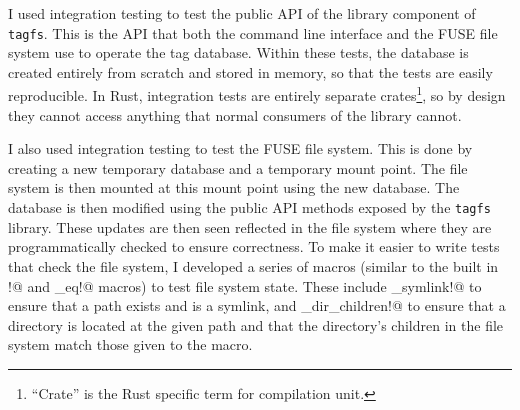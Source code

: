 I used integration testing to test the public API of the library component of
\texttt{tagfs}. This is the API that both the command line interface and the
FUSE file system use to operate the tag database. Within these tests, the
database is created entirely from scratch and stored in memory, so that the
tests are easily reproducible. In Rust, integration tests are entirely separate
crates\footnote{``Crate'' is the Rust specific term for compilation unit.}, so
by design they cannot access anything that normal consumers of the library
cannot.

I also used integration testing to test the FUSE file system. This is done by
creating a new temporary database and a temporary mount point. The file system
is then mounted at this mount point using the new database. The database is
then modified using the public API methods exposed by the \texttt{tagfs}
library. These updates are then seen reflected in the file system where they
are programmatically checked to ensure correctness. To make it easier to write
tests that check the file system, I developed a series of macros (similar to
the built in \verb@assert!@ and \verb@assert_eq!@ macros) to test file system
state. These include \verb@assert_symlink!@ to ensure that a path exists and is
a symlink, and \verb@assert_dir_children!@ to ensure that a directory is
located at the given path and that the directory's children in the file system
match those given to the macro.

